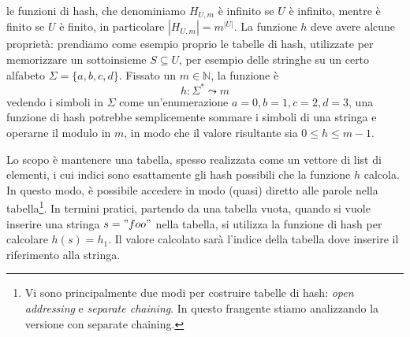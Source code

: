 le funzioni di hash, che denominiamo $H_{U,m}$ è infinito se $U$ è infinito, mentre è finito
se $U$ è finito, in particolare $|H_{U,m}| = m^{|U|}$.
La funzione $h$ deve avere alcune proprietà: prendiamo come esempio proprio le tabelle di hash,
utilizzate per memorizzare un sottoinsieme $S \subseteq U$, per esempio delle stringhe su un certo
alfabeto $\Sigma = \{a, b, c, d\}$. Fissato un $m \in \mathbb{N}$, la funzione è
$$
	h: \Sigma^* \leadsto m
$$
vedendo i simboli in $\Sigma$ come un'enumerazione $a = 0, b = 1, c =2, d = 3$,
una funzione di hash potrebbe semplicemente sommare i simboli di una stringa e
operarne il modulo in $m$, in modo che il valore risultante sia $0 \leq h \le m-1 $.

Lo scopo è mantenere una tabella, spesso realizzata come un vettore di list di
elementi, i cui indici sono esattamente gli hash possibili che la funzione $h$
calcola. In questo modo, è possibile accedere in modo (quasi) diretto alle
parole nella tabella\footnote{Vi sono principalmente due  modi per costruire
	tabelle di hash: \textit{open addressing} e \textit{separate chaining}.
	In questo frangente stiamo analizzando la versione con separate chaining.}.
In termini pratici, partendo da una tabella vuota, quando
si vuole inserire una stringa $s = "foo"$ nella tabella, si utilizza la funzione
di hash per calcolare $h(s) = h_1$. Il valore calcolato sarà l'indice della
tabella dove inserire il riferimento alla stringa.

